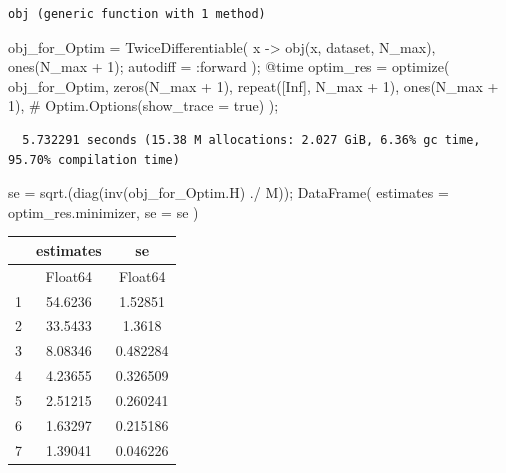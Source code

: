 \documentclass[
  letterpaper,
  DIV=11,
  numbers=noendperiod]{scrreprt}
\newenvironment{Shaded}{\begin{snugshade}}{\end{snugshade}}
\newcommand{\CommentTok}[1]{\textcolor[rgb]{0.37,0.37,0.37}{#1}}
\newcommand{\ConstantTok}[1]{\textcolor[rgb]{0.56,0.35,0.01}{#1}}
\newcommand{\FloatTok}[1]{\textcolor[rgb]{0.68,0.00,0.00}{#1}}
\newcommand{\FunctionTok}[1]{\textcolor[rgb]{0.28,0.35,0.67}{#1}}
\newcommand{\NormalTok}[1]{\textcolor[rgb]{0.00,0.23,0.31}{#1}}
\newcommand{\OperatorTok}[1]{\textcolor[rgb]{0.37,0.37,0.37}{#1}}
\newcommand{\PreprocessorTok}[1]{\textcolor[rgb]{0.68,0.00,0.00}{#1}}
\begin{document}
\begin{verbatim}
obj (generic function with 1 method)
\end{verbatim}

\begin{Shaded}
\begin{Highlighting}[]
\NormalTok{obj\_for\_Optim }\OperatorTok{=} \FunctionTok{TwiceDifferentiable}\NormalTok{(}
\NormalTok{    x }\OperatorTok{{-}\textgreater{}} \FunctionTok{obj}\NormalTok{(x, dataset, N\_max),}
    \FunctionTok{ones}\NormalTok{(N\_max }\OperatorTok{+} \FloatTok{1}\NormalTok{);}
\NormalTok{    autodiff }\OperatorTok{=} \OperatorTok{:}\NormalTok{forward}
\NormalTok{);}
\PreprocessorTok{@time}\NormalTok{ optim\_res }\OperatorTok{=} \FunctionTok{optimize}\NormalTok{(}
\NormalTok{    obj\_for\_Optim,}
    \FunctionTok{zeros}\NormalTok{(N\_max }\OperatorTok{+} \FloatTok{1}\NormalTok{),}
    \FunctionTok{repeat}\NormalTok{([}\ConstantTok{Inf}\NormalTok{], N\_max }\OperatorTok{+} \FloatTok{1}\NormalTok{),}
    \FunctionTok{ones}\NormalTok{(N\_max }\OperatorTok{+} \FloatTok{1}\NormalTok{),}
\CommentTok{\#     Optim.Options(show\_trace = true)}
\NormalTok{);}
\end{Highlighting}
\end{Shaded}

\begin{verbatim}
  5.732291 seconds (15.38 M allocations: 2.027 GiB, 6.36% gc time, 95.70% compilation time)
\end{verbatim}

\begin{Shaded}
\begin{Highlighting}[]
\NormalTok{se }\OperatorTok{=} \FunctionTok{sqrt}\NormalTok{.(}\FunctionTok{diag}\NormalTok{(}\FunctionTok{inv}\NormalTok{(obj\_for\_Optim.H) }\OperatorTok{./}\NormalTok{ M));}
\FunctionTok{DataFrame}\NormalTok{(}
\NormalTok{    estimates }\OperatorTok{=}\NormalTok{ optim\_res.minimizer,}
\NormalTok{    se }\OperatorTok{=}\NormalTok{ se}
\NormalTok{)}
\end{Highlighting}
\end{Shaded}

\begin{tabular}{r|cc}
    & estimates & se\\
    \hline
    & Float64 & Float64\\
    \hline
    1 & 54.6236 & 1.52851 \\
    2 & 33.5433 & 1.3618 \\
    3 & 8.08346 & 0.482284 \\
    4 & 4.23655 & 0.326509 \\
    5 & 2.51215 & 0.260241 \\
    6 & 1.63297 & 0.215186 \\
    7 & 1.39041 & 0.046226 \\
\end{tabular}
\end{document}
